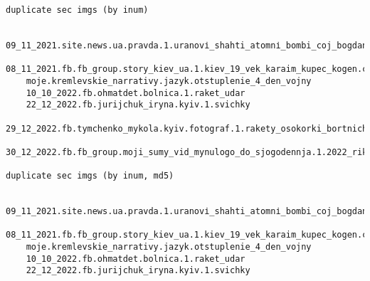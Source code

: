  
 
 
 
 

\begin{verbatim}
duplicate sec imgs (by inum)

	09_11_2021.site.news.ua.pravda.1.uranovі_shahti_atomnі_bombi_coj_bogdan_hmelnickij_ta_olіmpіjskij_mіshka__reportazh_zі_specmіsta_zhovtі_vodi
	08_11_2021.fb.fb_group.story_kiev_ua.1.kiev_19_vek_karaim_kupec_kogen.cmt
	moje.kremlevskie_narrativy.jazyk.otstuplenie_4_den_vojny
	10_10_2022.fb.ohmatdet.bolnica.1.raket_udar
	22_12_2022.fb.jurijchuk_iryna.kyiv.1.svichky
	29_12_2022.fb.tymchenko_mykola.kyiv.fotograf.1.rakety_osokorki_bortnichi
	30_12_2022.fb.fb_group.moji_sumy_vid_mynulogo_do_sjogodennja.1.2022_rik

duplicate sec imgs (by inum, md5)

	09_11_2021.site.news.ua.pravda.1.uranovі_shahti_atomnі_bombi_coj_bogdan_hmelnickij_ta_olіmpіjskij_mіshka__reportazh_zі_specmіsta_zhovtі_vodi
	08_11_2021.fb.fb_group.story_kiev_ua.1.kiev_19_vek_karaim_kupec_kogen.cmt
	moje.kremlevskie_narrativy.jazyk.otstuplenie_4_den_vojny
	10_10_2022.fb.ohmatdet.bolnica.1.raket_udar
	22_12_2022.fb.jurijchuk_iryna.kyiv.1.svichky

\end{verbatim}
